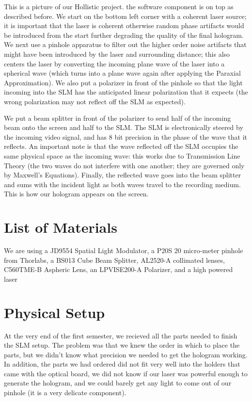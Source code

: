 \documentclass[12pt]{article}
\begin{document}
This is a picture of our Hollistic project. the software component is on top as described before. We start on the bottom left corner with a coherent laser source; it is important that the laser is coherent otherwise random phase artifacts would be introduced from the start further degrading the quality of the final hologram. We next use a pinhole apparatus to filter out the higher order noise artifacts that might have been introduced by the laser and surrounding distance; this also centers the laser by converting the incoming plane wave of the laser into a spherical wave (which turns into a plane wave again after applying the Paraxial Approximation). We also put a polarizer in front of the pinhole so that the light incoming into the SLM has the anticipated linear polarization that it expects (the wrong polarization may not reflect off the SLM as expected).

We put a beam splitter in front of the polarizer to send half of the incoming beam onto the screen and half to the SLM. The SLM is electronically steered by the incoming video signal, and has 8 bit precision in the phase of the wave that it reflects. An important note is that the wave reflected off the SLM occupies the same physical space as the incoming wave: this works due to Transmission Line Theory (the two waves do not interfere with one another; they are governed only by Maxwell's Equations). Finally, the reflected wave goes into the beam splitter and sums with the incident light as both waves travel to the recording medium. This is how our hologram appears on the screen.

\section{List of Materials}

We are using a JD9554 Spatial Light Modulator, a P20S 20 micro-meter pinhole from Thorlabs, a BS013 Cube Beam Splitter, AL2520-A collimated lenses, C560TME-B Aspheric Lens, an LPVISE200-A Polarizer, and a high powered laser

\section{Physical Setup}
At the very end of the first semester, we recieved all the parts needed to finish the SLM setup. The problem was that we knew the order in which to place the parts, but we didn't know what precision we needed to get the hologram working. In addition, the parts we had ordered did not fit very well into the holders that came with the optical board, we did not know if our laser was powerful enough to generate the hologram, and we could barely get any light to come out of our pinhole (it is a very delicate component).
\end{document}
